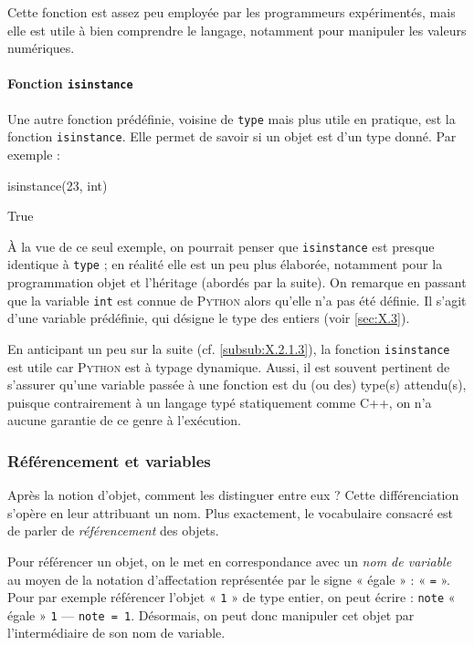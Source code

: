 Cette fonction est assez peu employée par les programmeurs expérimentés, mais elle est utile à bien comprendre le langage, notamment pour manipuler les valeurs numériques.

\paragraph*{Fonction \normalfont\texttt{isinstance}} Une autre fonction prédéfinie, voisine de \texttt{type} mais plus utile en pratique, est la fonction \texttt{isinstance}. Elle permet de savoir si un objet est d'un type donné. Par exemple :

\begin{nbjupyterin}[before skip=6pt, after skip=1pt]{3}
isinstance(23, int)
\end{nbjupyterin}
\begin{nbjupyterout}[before skip=1pt, after skip=4pt]{3}
True
\end{nbjupyterout}

À la vue de ce seul exemple, on pourrait penser que \texttt{isinstance} est presque identique à \texttt{type} ; en réalité elle est un peu plus élaborée, notamment pour la programmation objet et l'héritage (abordés par la suite).
On remarque en passant que la variable \texttt{int} est connue de \textsc{Python} alors qu'elle n'a pas été définie. Il s'agit d'une variable prédéfinie, qui désigne le type des entiers (voir \cref{sec:X.3}).

En anticipant un peu sur la suite (cf. \cref{subsub:X.2.1.3}), la fonction \texttt{isinstance} est utile car \textsc{Python} est à typage dynamique. Aussi, il est souvent pertinent de s'assurer qu'une variable passée à une fonction est du (ou des) type(s) attendu(s), puisque contrairement à un langage typé statiquement comme C++, on n'a aucune garantie de ce genre à l'exécution.


\subsubsection[Référencement et variables]{Référencement et variables}
\label{subsub:X.2.1.2}

Après la notion d'objet, comment les distinguer entre eux ? Cette différenciation s'opère en leur attribuant un nom. Plus exactement, le vocabulaire consacré est de parler de \emph{référencement} des objets.

Pour référencer un objet, on le met en correspondance avec un \emph{nom de variable} au moyen de la notation d'affectation représentée par le signe « égale » : « \texttt{=} ». Pour par exemple référencer l'objet « \texttt{1} » de type entier, on peut écrire : \texttt{note} « égale » \texttt{1} --- \texttt{note = 1}. Désormais, on peut donc manipuler cet objet par l'intermédiaire de son nom de variable.

